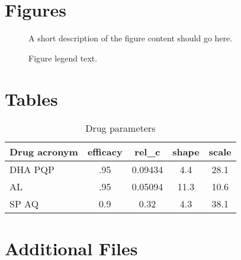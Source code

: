 \documentclass{bmcart}
\begin{document}
\begin{backmatter}


\section*{Figures}
  \begin{figure}[h!]
  \caption{
      A short description of the figure content
      should go here.}
      \end{figure}

\begin{figure}[h!]
  \caption{
      Figure legend text.}
      \end{figure}


\section*{Tables}
\begin{table}[h!]
\caption{Drug parameters}
      \begin{tabular}{l | cccc}
        \hline
        Drug acronym & efficacy & rel\_c & shape & scale \\ \hline
        DHA PQP & .95 & 0.09434 & 4.4 & 28.1\\    
        AL & .95 & 0.05094 & 11.3 & 10.6\\
        SP AQ & 0.9 & 0.32 & 4.3 & 38.1\\ \hline
      \end{tabular}
\end{table}


\section*{Additional Files}

\end{backmatter}
\end{document}
